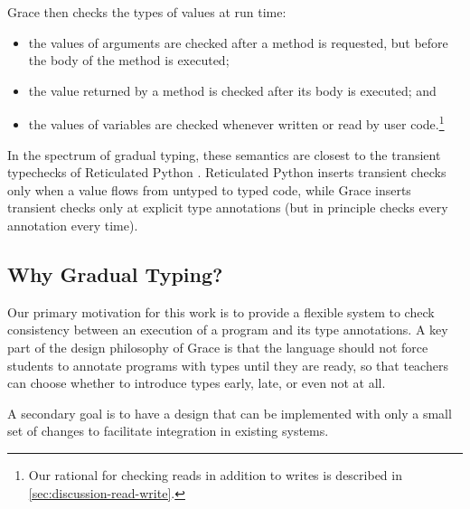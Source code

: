 Grace then checks the types of values at run time:
%
\begin{itemize}
\item the values of arguments are checked after a method is requested, 
      but before the body of the method is executed;
\item the value returned by a method is checked after its body is executed; and
\item the values of variables are checked
      whenever written or read by user code.\footnote{
        Our rational for checking reads in addition to writes
        is described in \cref{sec:discussion-read-write}.}
\end{itemize}
%
%
%
%
In the spectrum of gradual typing, these semantics are
closest to the
transient typechecks of Reticulated Python
\cite{reticPython2014,Greenman2018}.
Reticulated Python inserts transient checks only when a value flows from untyped
to typed code, while Grace inserts transient checks only at explicit type
annotations (but in principle checks every annotation every time).



\subsection{Why Gradual Typing?}


Our primary motivation for this work
is to provide a flexible system 
to check consistency between an execution of a program
and its type annotations.
A key part of the design philosophy of Grace is that the language should not force
students to annotate programs with types until they are ready, so that
teachers can choose whether to introduce types early, late, or even
not at all. 

A secondary goal is to have a design that can be implemented with
only a small set of changes to facilitate integration in existing systems.

